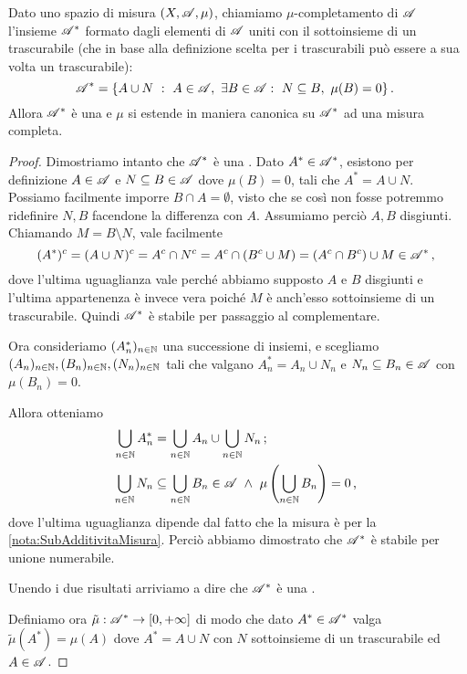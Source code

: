\begin{proposition}\label{prop:CompletamentoMisura}
	Dato uno spazio di misura $(X,\mathscr A,\mu)$, chiamiamo $\mu$-completamento di $\mathscr A$ l'insieme $\mathscr A^*$ formato dagli elementi di $\mathscr A$
	uniti con il sottoinsieme di un trascurabile (che in base alla definizione scelta per i trascurabili può essere a sua volta un trascurabile):
	\begin{equation*}
		\A^*=\{A\cup N\ :\ A\in\A,\ \exists B\in \A:\ N\subseteq B,\ \mu(B)=0\} \punto
	\end{equation*}
	Allora $\mathscr A^*$ è una \sigalg{} e $\mu$ si estende in maniera canonica su $\mathscr A^*$ ad una misura completa.
\end{proposition}
\begin{proof}
	Dimostriamo intanto che $\mathscr A^*$ è una \sigalg{}.
	Dato $A^*\in\mathscr A^*$, esistono per definizione $A\in\mathscr A$ e $N\subseteq B\in\mathscr A$ dove $\mu(B)=0$, tali che $A^*=A\cup N$. Possiamo facilmente imporre $B\cap A=\emptyset$, visto che se così non fosse potremmo ridefinire $N,B$ facendone la differenza con $A$. Assumiamo perciò $A,B$ disgiunti.
	Chiamando $M=B\setminus N$, vale facilmente
	\begin{equation*}
		(A^*)^c=(A\cup N)^c=A^c\cap N^c=A^c\cap(B^c\cup M)=(A^c\cap B^c )\cup M \in\mathscr A^* \, \text{, }
	\end{equation*}
	dove l'ultima uguaglianza vale perché abbiamo supposto $A$ e $B$ disgiunti e l'ultima appartenenza è invece vera poiché $M$ è anch'esso sottoinsieme di un trascurabile. Quindi $\mathscr A^*$ è stabile per passaggio al complementare.
	
	Ora consideriamo $(A^*_n)_{n\in\mathbb N}$ una successione di insiemi, e scegliamo $(A_n)_{n\in\mathbb N},(B_n)_{n\in\mathbb N},(N_n)_{n\in\mathbb N}$ tali che valgano $A^*_n=A_n\cup N_n$ e $N_n\subseteq B_n\in\mathscr A$ con $\mu(B_n)=0$.
	
	Allora otteniamo
	\begin{align*}
		\bigcup_{n\in\N}A^*_n &=\bigcup_{n\in\N}A_n \cup \bigcup_{n\in\N}N_n \puntovirgola\\
		\bigcup_{n\in\N}N_n &\subseteq \bigcup_{n\in\N}B_n\in\A\ \wedge\ \mu\left(\bigcup_{n\in\N}B_n\right)=0 \virgola
	\end{align*}
	dove l'ultima uguaglianza dipende dal fatto che la misura è \sigsubadd{} per la \cref{nota:SubAdditivitaMisura}. Perciò abbiamo dimostrato che $\mathscr A^*$ è stabile per unione numerabile.
	
	Unendo i due risultati arriviamo a dire che $\mathscr A^*$ è una \sigalg{}.
	
	Definiamo ora $\tilde\mu:\mathscr A^*\to[0,+\infty]$ di modo che dato $A^*\in\mathscr A^*$ valga $\tilde\mu(A^*)=\mu(A)$ dove $A^*=A\cup N$ con $N$ sottoinsieme di un trascurabile ed $A\in\mathscr A$.
	

\end{proof}
